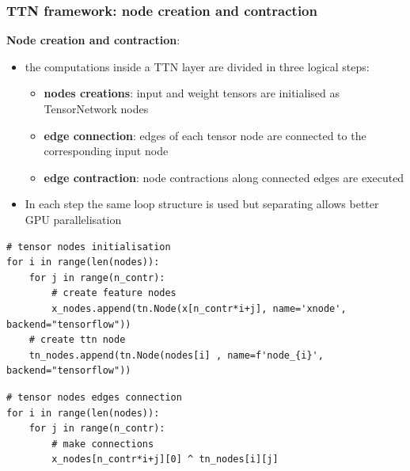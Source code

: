 \documentclass[xcolor=table,8pt]{beamer}
\begin{document}
    
    \begin{frame}[t, fragile]
        \frametitle{TTN framework: node creation and contraction}

        \textbf{Node creation and contraction}:
        \begin{itemize}
            \item the computations inside a TTN layer are divided in three logical steps:
            \begin{itemize}
                \item \alert{\textbf{nodes creations}}: input and weight tensors are initialised as TensorNetwork nodes
                \item \alert{\textbf{edge connection}}: edges of each tensor node are connected to the corresponding input node 
                \item \alert{\textbf{edge contraction}}: node contractions along connected edges are executed
            \end{itemize}
        \item In each step the same loop structure is used but separating allows better GPU parallelisation
        \end{itemize}
    
        \begin{lstlisting}[style=mypython, numbers=none, frame=single, aboveskip=5pt, belowskip=2.5pt, backgroundcolor=\color{white},rulecolor=\color{beamer@blendedblue},framerule=0.1pt]
# tensor nodes initialisation
for i in range(len(nodes)):
    for j in range(n_contr):
        # create feature nodes
        x_nodes.append(tn.Node(x[n_contr*i+j], name='xnode', backend="tensorflow"))
    # create ttn node
    tn_nodes.append(tn.Node(nodes[i] , name=f'node_{i}', backend="tensorflow"))
        \end{lstlisting}

        \begin{lstlisting}[style=mypython, numbers=none, frame=single, aboveskip=2.5pt, belowskip=2.5pt, backgroundcolor=\color{white},rulecolor=\color{beamer@blendedblue},framerule=0.1pt]
# tensor nodes edges connection
for i in range(len(nodes)):
    for j in range(n_contr): 
        # make connections
        x_nodes[n_contr*i+j][0] ^ tn_nodes[i][j]
        \end{lstlisting}


\end{frame}
\end{document}

